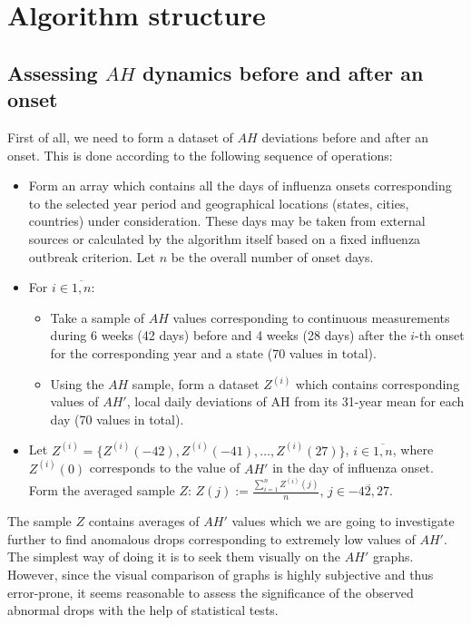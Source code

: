 \documentclass[3p,times,procedia]{elsarticle}
\begin{document}
\section{Algorithm structure}

\subsection{Assessing $AH$ dynamics before and after an onset}

First of all, we need to form a dataset of $AH$ deviations before and after an onset. This is done according to the following sequence of operations:

\begin{itemize}
\item Form an array which contains all the days of influenza onsets corresponding to the selected year period and geographical locations (states, cities, countries) under consideration. These days may be taken from external sources or calculated by the algorithm itself based on a fixed influenza outbreak criterion. Let $n$ be the overall number of onset days.

\item For $i \in \overline{1,n}$:
\begin{itemize}
\item Take a sample of $AH$ values corresponding to continuous measurements during 6 weeks (42 days) before and 4 weeks (28 days) after the $i$-th onset for the corresponding year and a state (70 values in total).
\item Using the $AH$ sample, form a dataset $Z{^{(i)}}$ which contains corresponding values of $AH'$, local daily deviations of AH from its 31-year mean for each day (70 values in total).
\end{itemize}

\item Let $Z^{(i)} = \{ Z^{(i)}(-42), Z^{(i)}(-41), \dots, Z^{(i)}(27)\}$, $i \in \overline{1,n}$, where $Z^{(i)}(0)$ corresponds to the value of $AH'$ in the day of influenza onset. Form the averaged sample $Z$: $Z(j) :=  \frac{\sum^{n}_{i=1} Z^{(i)}(j)}{n}$, $j \in \overline{-42,27}$.
\end{itemize}

The sample $Z$ contains averages of $AH'$ values which we are going to investigate further to find anomalous drops corresponding to extremely low values of $AH'$. The simplest way of doing it is to seek them visually on the $AH'$ graphs. However, since the visual comparison of graphs is highly subjective and thus error-prone, it seems reasonable to assess the significance of the observed abnormal drops with the help of statistical tests.
\end{document}
